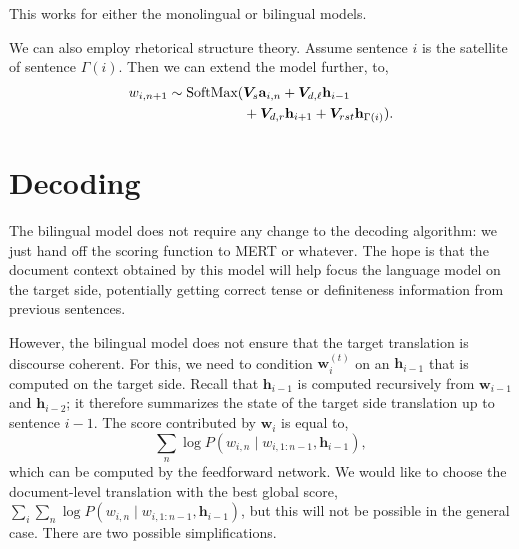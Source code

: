 \documentclass[11pt,a4paper]{article}
\renewcommand{\vec}[1]{\mathbf{#1}}
\newcommand{\vh}[0]{\vec{h}}
\newcommand{\vw}[0]{\vec{w}}
\newcommand{\vwt}[0]{\vw^{(t)}}
\newcommand{\va}[0]{\vec{a}}
\newcommand{\mat}[1]{\bm{#1}}
\begin{document}
This works for either the monolingual or bilingual models. 

We can also employ rhetorical structure theory. Assume sentence $i$ is the satellite of sentence $\Gamma(i)$. Then we can extend the model further, to,
\begin{align}
\notag
w_{i,n+1} \sim \text{SoftMax}(& \mat{V}_s \va_{i,n} + \mat{V}_{d,\ell} \vh_{i-1}\\
&  + \mat{V}_{d,r} \vh_{i+1} + \mat{V}_{rst} \vh_{\Gamma(i)}).
\end{align}

\section{Decoding}
The bilingual model does not require any change to the decoding algorithm: we just hand off the scoring function to MERT or whatever. The hope is that the document context obtained by this model will help focus the language model on the target side, potentially getting correct tense or definiteness information from previous sentences.

However, the bilingual model does not ensure that the target translation is discourse coherent. For this, we need to condition $\vwt_i$ on an $\vh_{i-1}$ that is computed on the target side. Recall that $\vh_{i-1}$ is computed recursively from $\vw_{i-1}$ and $\vh_{i-2}$; it therefore summarizes the state of the target side translation up to sentence $i-1$. The score contributed by $\vw_i$ is equal to,
\begin{equation}
\sum_n \log P(w_{i,n} \mid w_{i,1:n-1}, \vh_{i-1}),
\end{equation}
which can be computed by the feedforward network. We would like to choose the document-level translation with the best global score, $\sum_i \sum_n \log P(w_{i,n} \mid w_{i,1:n-1}, \vh_{i-1})$, but this will not be possible in the general case. There are two possible simplifications.
\end{document}
